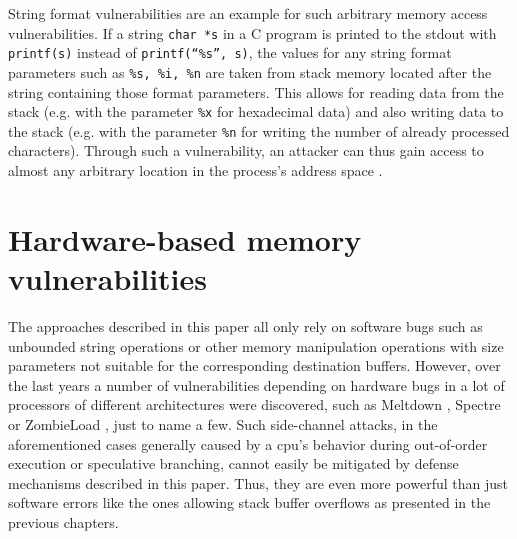 String format vulnerabilities are an example for such arbitrary memory access vulnerabilities.
If a string \texttt{char *s} in a C program is printed to the \gls{stdout} with \texttt{printf(s)} instead of \texttt{printf(``\%s'', s)}, the values for any string format parameters such as \texttt{\%s, \%i, \%n} are taken from stack memory located after the string containing those format parameters.
This allows for reading data from the stack (e.g. with the parameter \texttt{\%x} for hexadecimal data) and also writing data to the stack (e.g. with the parameter \texttt{\%n} for writing the number of already processed characters).
Through such a vulnerability, an attacker can thus gain access to almost any arbitrary location in the process's address space \cite{scut2001}.

\section{Hardware-based memory vulnerabilities}
\label{sec:hardware-based-memory-vulnerabilities}

The approaches described in this paper all only rely on software bugs such as unbounded string operations or other memory manipulation operations with size parameters not suitable for the corresponding destination buffers.
However, over the last years a number of vulnerabilities depending on hardware bugs in a lot of processors of different architectures were discovered, such as Meltdown \cite{Lipp2018}, Spectre \cite{Kocher2019} or ZombieLoad \cite{Schwarz2019}, just to name a few.
Such side-channel attacks, in the aforementioned cases generally caused by a \gls{cpu}'s behavior during out-of-order execution or speculative branching, cannot easily be mitigated by defense mechanisms described in this paper.
Thus, they are even more powerful than just software errors like the ones allowing stack buffer overflows as presented in the previous chapters.
